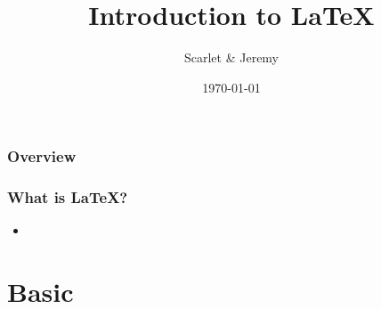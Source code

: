 \documentclass{beamer}
\title[Intro to \LaTeX]{Introduction to \LaTeX}
\author{Scarlet \& Jeremy}
\institute[Cornell University]{
Cornell University \\
\medskip
\textit{hy323 \& jlf248}
}
\date{\today}
\begin{document}
\begin{frame}
  \titlepage
\end{frame}

\begin{frame}
  \frametitle{Overview}
  \tableofcontents
\end{frame}

\begin{frame}
  \frametitle{What is \LaTeX?}
  \begin{itemize}
    \item
  \end{itemize}
\end{frame}

\section{Basic}
\end{document}
